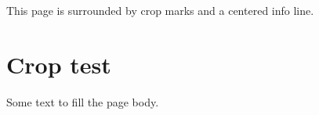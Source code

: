 \documentclass{article}
\begin{document}
This page is surrounded by crop marks and a centered info line.
\section*{Crop test}
Some text to fill the page body.
\end{document}
